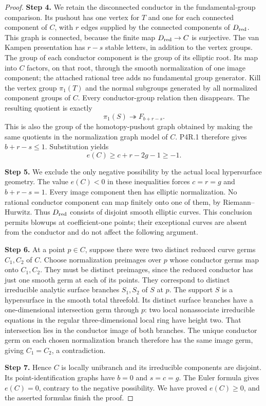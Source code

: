 \begin{proof}
\noindent\textbf{Step 4.} We retain the disconnected conductor in the
fundamental-group comparison. Its pushout has
one vertex for $T$ and one for each connected
component of $C$, with $r$ edges supplied by
the connected components of $D_{\rm red}$.
This graph is connected, because the finite
map $D_{\rm red}\to C$ is surjective.
The van Kampen presentation has $r-s$ stable
letters, in addition to the vertex groups.
The group of each conductor component is the
group of its elliptic root. Its map into $C$
factors, on that root, through the smooth
normalization of one image component; the
attached rational tree adds no fundamental
group generator. Kill the vertex group
$\pi_1(T)$ and the normal subgroups generated
by all normalized component groups of $C$.
Every conductor-group relation then disappears.
The resulting quotient is exactly
\[
 \pi_1(S)\twoheadrightarrow F_{b+r-s}.
\]
This is also the group of the homotopy-pushout
graph obtained by making the same quotients in
the normalization graph model of $C$. P4R.1
therefore gives $b+r-s\le1$. Substitution yields
\[
 e(C)\ge c+r-2g-1\ge-1.
\]

\noindent\textbf{Step 5.} We exclude the only negative possibility by
the actual local hypersurface geometry.
The value $e(C)<0$ in these inequalities
forces $c=r=g$ and $b+r-s=1$. Every image
component then has elliptic normalization.
No rational conductor component can map
finitely onto one of them, by
Riemann--Hurwitz. Thus $D_{\rm red}$ consists
of disjoint smooth elliptic curves. This
conclusion permits blowups at coefficient-one
points; their exceptional curves are absent
from the conductor and do not affect the
following argument.

\noindent\textbf{Step 6.} At a point $p\in C$, suppose there were two
distinct reduced curve germs $C_1,C_2$ of
$C$. Choose normalization preimages over $p$
whose conductor germs map onto $C_1,C_2$.
They must be distinct preimages, since the
reduced conductor has just one smooth germ
at each of its points. They correspond to
distinct irreducible analytic surface
branches $S_1,S_2$ of $S$ at $p$.
The support $S$ is a hypersurface in the
smooth total threefold. Its distinct
surface branches have a one-dimensional
intersection germ through $p$: two local
nonassociate irreducible equations in the
regular three-dimensional local ring have
height two. That intersection lies in the
conductor image of both branches. The
unique conductor germ on each chosen
normalization branch therefore has the
same image germ, giving $C_1=C_2$, a
contradiction.

\noindent\textbf{Step 7.} Hence $C$ is locally unibranch and its
irreducible components are disjoint. Its
point-identification graphs have $b=0$
and $s=c=g$. The Euler formula gives
$e(C)=0$, contrary to the negative
possibility. We have proved $e(C)\ge0$,
and the asserted formulas finish the proof.
\end{proof}

